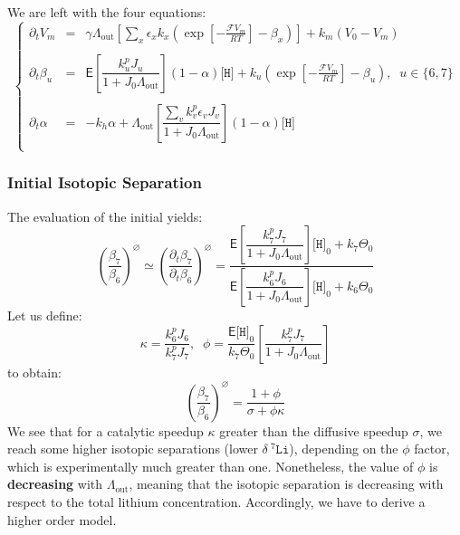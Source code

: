 \documentclass[aps,onecolumn,11pt]{revtex4}
\newcommand{\mychem}[1]{\mathtt{#1}}
\newcommand{\myconc}[1]{\big[#1\big]}
\newcommand{\Faraday}{\mathcal{F}}
\newcommand{\spLi}[1]{{\!~^{#1}\mychem{Li}}}
\newcommand{\spproton}{\mychem{H}}
\newcommand{\proton}{\myconc{\spproton}}
\newcommand{\deltaLi}{\delta\!\!\spLi{7}}
\newcommand{\myout}[1]{{#1}_{\mathrm{out}}}
\newcommand{\LiAll}{\Lambda}
\newcommand{\LiAllOut}{\myout{\LiAll}}
\begin{document}
We are left with the four equations:
\begin{equation}
\left\lbrace
\begin{array}{rcl}
\partial_t V_m & = & \gamma\LiAllOut \left[\sum_x \epsilon_x k_x \left( \exp\left[ -\frac{\Faraday V_m}{RT}\right] -\beta_x \right)  \right] + k_m\left(V_0-V_m\right)\\
\\
\partial_t \beta_u & = & \mathsf{E} \left[\dfrac{k^p_u J_u}{1+J_0 \LiAllOut}\right] \left(1-\alpha\right) \proton
	 + k_u \left( \exp\left[-\frac{\Faraday V_m}{RT}\right] - \beta_u\right),\;\;u\in\lbrace6,7\rbrace\\
\\
\partial_t \alpha  & = &  -k_h\alpha + \LiAllOut \left[\dfrac{ \sum_v k^p_v \epsilon_v J_v}{1+J_0\LiAllOut}\right] \left(1-\alpha\right) \proton\\
\end{array}
\right.
\end{equation}

\subsubsection{Initial Isotopic Separation}
The evaluation of the initial yields:
\begin{equation}
\label{eq:level1}
	\left(\dfrac{\beta_7}{\beta_6}\right)^\varnothing \simeq \left(\dfrac{\partial_t \beta_7}{\partial_t\beta_6}\right)^\varnothing
	= \dfrac{\mathsf{E} \left[\dfrac{k^p_7 J_7}{1+J_0 \LiAllOut}\right] \proton_0 + k_7  \Theta_0
	}
	{
	\mathsf{E} \left[\dfrac{k^p_6 J_6}{1+J_0 \LiAllOut}\right] \proton_0 + k_6  \Theta_0
	}
\end{equation}
Let us define:
\begin{equation}
	\kappa = \dfrac{k^p_6 J_6}{k^p_7 J_7}, \;\; \phi = \dfrac{ \mathsf{E} \proton_0 }{ k_7  \Theta_0 } \left[\dfrac{k^p_7 J_7}{1+J_0 \LiAllOut}\right] 
\end{equation}
to obtain:
\begin{equation}
	\left(\dfrac{\beta_7}{\beta_6}\right)^\varnothing = \dfrac{1+\phi}{\sigma+\phi\kappa}
\end{equation}
We see that for a catalytic speedup $\kappa$ greater than the diffusive speedup $\sigma$, we reach some higher isotopic separations (lower $\deltaLi$), depending
on the $\phi$ factor, which is experimentally much greater than one.
Nonetheless, the value of $\phi$ is {\bf decreasing} with $\LiAllOut$, meaning that the isotopic separation is decreasing with respect to the total lithium concentration.
Accordingly, we have to derive a higher order model.
\end{document}
